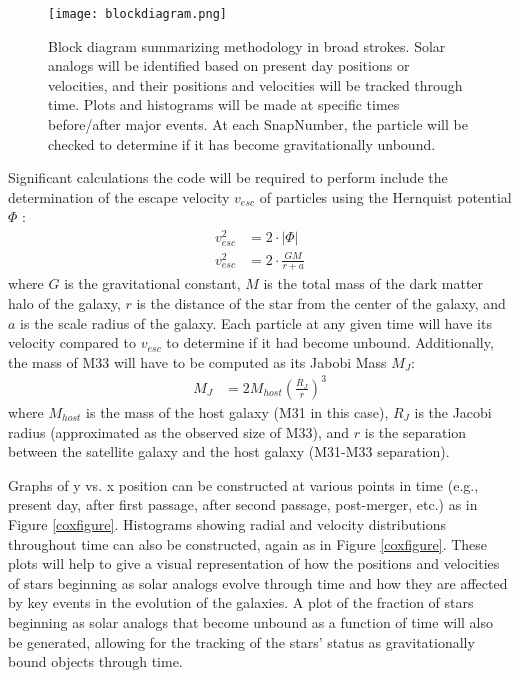 \documentclass{aastex63}
\begin{document}
\begin{figure}
    \centering
    \texttt{[image: blockdiagram.png]}
    \caption{Block diagram summarizing methodology in broad strokes. Solar analogs will be identified based on present day positions or velocities, and their positions and velocities will be tracked through time. Plots and histograms will be made at specific times before/after major events. At each SnapNumber, the particle will be checked to determine if it has become gravitationally unbound.}
    \label{blockdiagram}
\end{figure}

Significant calculations the code will be required to perform include the determination of the escape velocity $v_{esc}$ of particles using the Hernquist potential $\Phi$ \citep{hernquist90}:
\begin{align}
    v_{esc}^2 &= 2 \cdot |\Phi|\\
    v_{esc}^2 &= 2 \cdot \frac{GM}{r+a}
\end{align}
where $G$ is the gravitational constant, $M$ is the total mass of the dark matter halo of the galaxy, $r$ is the distance of the star from the center of the galaxy, and $a$ is the scale radius of the galaxy. Each particle at any given time will have its velocity compared to $v_{esc}$ to determine if it had become unbound. Additionally, the mass of M33 will have to be computed as its Jabobi Mass $M_J$:
\begin{align}
    M_J &= 2M_{host}\left(\frac{R_J}{r}\right)^3
\end{align}
where $M_{host}$ is the mass of the host galaxy (M31 in this case), $R_J$ is the Jacobi radius (approximated as the observed size of M33), and $r$ is the separation between the satellite galaxy and the host galaxy (M31-M33 separation). 

Graphs of y vs. x position can be constructed at various points in time (e.g., present day, after first passage, after second passage, post-merger, etc.) as in Figure \ref{coxfigure}. Histograms showing radial and velocity distributions throughout time can also be constructed, again as in Figure \ref{coxfigure}. These plots will help to give a visual representation of how the positions and velocities of stars beginning as solar analogs evolve through time and how they are affected by key events in the evolution of the galaxies. A plot of the fraction of stars beginning as solar analogs that become unbound as a function of time will also be generated, allowing for the tracking of the stars' status as gravitationally bound objects through time.
\end{document}
